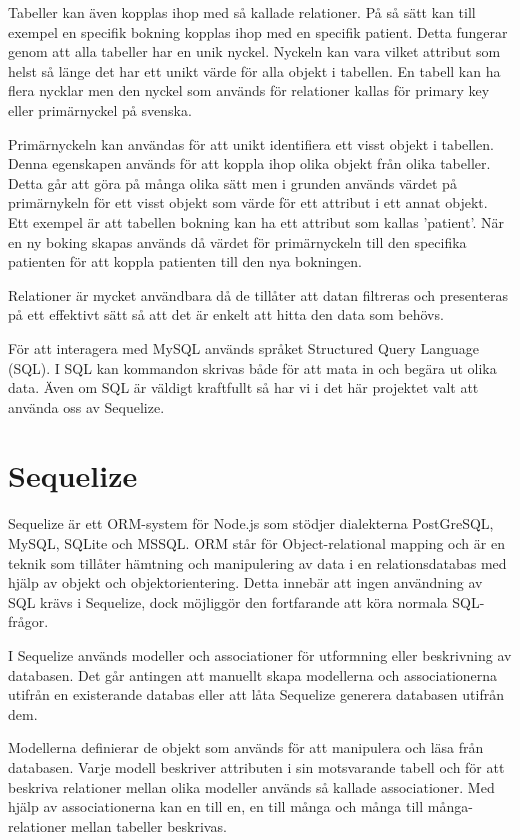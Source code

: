 Tabeller kan även kopplas ihop med så kallade relationer. På så sätt kan till exempel en specifik bokning kopplas ihop med en specifik patient. Detta fungerar genom att alla tabeller har en unik nyckel. Nyckeln kan vara vilket attribut som helst så länge det har ett unikt värde för alla objekt i tabellen. En tabell kan ha flera nycklar men den nyckel som används för relationer kallas för primary key eller primärnyckel på svenska.

Primärnyckeln kan användas för att unikt identifiera ett visst objekt i tabellen. Denna egenskapen används för att koppla ihop olika objekt från olika tabeller. Detta går att göra på många olika sätt men i grunden används värdet på primärnykeln för ett visst objekt som värde för ett attribut i ett annat objekt. Ett exempel är att tabellen bokning kan ha ett attribut som kallas 'patient'. När en ny boking skapas används då värdet för primärnyckeln till den specifika patienten för att koppla patienten till den nya bokningen.

Relationer är mycket användbara då de tillåter att datan filtreras och presenteras på ett effektivt sätt så att det är enkelt att hitta den data som behövs.

För att interagera med MySQL används språket Structured Query Language (SQL). I SQL kan kommandon skrivas både för att mata in och begära ut olika data. Även om SQL är väldigt kraftfullt så har vi i det här projektet valt att använda oss av Sequelize.


\section{Sequelize}\label{sec:sequelize_teori}
Sequelize är ett ORM-system för Node.js som stödjer dialekterna PostGreSQL, MySQL, SQLite och MSSQL. \cite{sequelize} ORM står för Object-relational mapping och är en teknik som tillåter hämtning och manipulering av data i en relationsdatabas med hjälp av objekt och objektorientering. Detta innebär att ingen användning av SQL krävs i Sequelize, dock möjliggör den fortfarande att köra normala SQL-frågor.

I Sequelize används modeller och associationer för utformning eller beskrivning av databasen. Det går antingen att manuellt skapa modellerna och associationerna utifrån en existerande databas eller att låta Sequelize generera databasen utifrån dem.

Modellerna definierar de objekt som används för att manipulera och läsa från databasen. Varje modell beskriver attributen i sin motsvarande tabell och för att beskriva relationer mellan olika modeller används så kallade associationer. Med hjälp av associationerna kan en till en, en till många och många till många-relationer mellan tabeller beskrivas.

